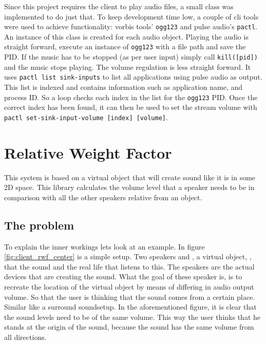 Since this project requires the client to play audio files, a small class was implemented to do just that.
To keep development time low, a couple of cli tools were used to achieve functionality: vorbis tools' \texttt{ogg123} and pulse audio's \texttt{pactl}.
An instance of this class is created for each audio object.
Playing the audio is straight forward, execute an instance of \texttt{ogg123} with a file path and save the PID.
If the music has to be stopped (as per user input) simply call \texttt{kill([pid])} and the music stops playing.
The volume regulation is less straight forward.
It uses \texttt{pactl list sink-inputs} to list all applications using pulse audio as output.
This list is indexed and contains information such as application name, and process ID.
So a loop checks each index in the list for the \texttt{ogg123} PID.
Once the correct index has been found, it can then be used to set the stream volume with \texttt{pactl set-sink-input-volume [index] [volume]}.

\section{Relative Weight Factor}
\label{sec:client_relative_weight_factor}

This system is based on a virtual object that will create sound like it is in some 2D space.
This library calculates the volume level that a speaker needs to be in comparison with all the other speakers relative from an object.

\subsection{The problem}
\label{sub:client_rwf_the_problem}

To explain the inner workings lets look at an example.
In figure \ref{fig:client_rwf_center} is a simple setup. Two speakers  and , a virtual object, , that  the sound and the real life  that listens to this.
The speakers are the actual devices that are creating the sound.
What the goal of these speaker is, is to recreate the location of the virtual object by means of differing in audio output volume.
So that the user is thinking that the sound comes from a certain place.
Similar like a surround sound\footnotemark setup.
In the aforementioned figure, it is clear that the sound levels need to be of the same volume.
This way the user thinks that he stands at the origin of the sound, because the sound has the same volume from all directions.

